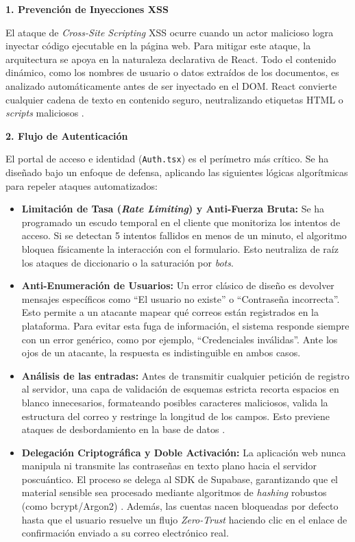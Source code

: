 \documentclass[11pt, a4paper]{report}
\theoremstyle{definition}
\begin{document}
\textbf{1. Prevención de Inyecciones XSS}

El ataque de \textit{Cross-Site Scripting} XSS ocurre cuando un actor malicioso logra inyectar código ejecutable en la página web. Para mitigar este ataque, la arquitectura se apoya en la naturaleza declarativa de React. Todo el contenido dinámico, como los nombres de usuario o datos extraídos de los documentos, es analizado automáticamente antes de ser inyectado en el DOM. React convierte cualquier cadena de texto en contenido seguro, neutralizando etiquetas HTML o \textit{scripts} maliciosos \cite{owasp_xss}.\vspace{0.3cm}

\textbf{2. Flujo de Autenticación}\vspace{0.3cm}

El portal de acceso e identidad (\texttt{Auth.tsx}) es el perímetro más crítico. Se ha diseñado bajo un enfoque de defensa, aplicando las siguientes lógicas algorítmicas para repeler ataques automatizados:

\begin{itemize}
    \item \textbf{Limitación de Tasa (\textit{Rate Limiting}) y Anti-Fuerza Bruta:} Se ha programado un escudo temporal en el cliente que monitoriza los intentos de acceso. Si se detectan 5 intentos fallidos en menos de un minuto, el algoritmo bloquea físicamente la interacción con el formulario. Esto neutraliza de raíz los ataques de diccionario o la saturación por \textit{bots}.
    
    \item \textbf{Anti-Enumeración de Usuarios:} Un error clásico de diseño es devolver mensajes específicos como ``El usuario no existe'' o ``Contraseña incorrecta''. Esto permite a un atacante mapear qué correos están registrados en la plataforma. Para evitar esta fuga de información, el sistema responde siempre con un error genérico, como por ejemplo, ``Credenciales inválidas''. Ante los ojos de un atacante, la respuesta es indistinguible en ambos casos.
    
    \item \textbf{Análisis de las entradas:} Antes de transmitir cualquier petición de registro al servidor, una capa de validación de esquemas estricta recorta espacios en blanco innecesarios, formateando posibles caracteres maliciosos, valida la estructura del correo y restringe la longitud de los campos. Esto previene ataques de desbordamiento en la base de datos \cite{owasp_input_validation}.
    
    \item \textbf{Delegación Criptográfica y Doble Activación:} La aplicación web nunca manipula ni transmite las contraseñas en texto plano hacia el servidor poscuántico. El proceso se delega al SDK de Supabase, garantizando que el material sensible sea procesado mediante algoritmos de \textit{hashing} robustos (como bcrypt/Argon2) \cite{owasp_password_storage}. Además, las cuentas nacen bloqueadas por defecto hasta que el usuario resuelve un flujo \textit{Zero-Trust} haciendo clic en el enlace de confirmación enviado a su correo electrónico real.
\end{itemize}
\end{document}

